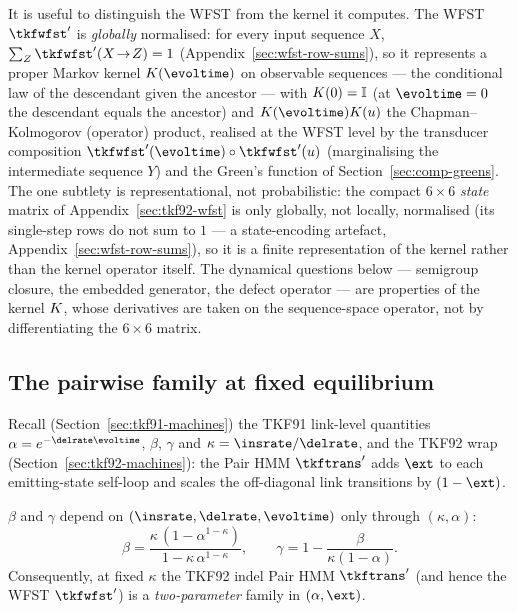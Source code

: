 It is useful to distinguish the WFST from the kernel it computes.  The
WFST $\tkfwfst'$ is \emph{globally} normalised: for every input sequence
$X$, $\sum_Z \tkfwfst'(X\!\to\!Z)=1$ (Appendix~\ref{sec:wfst-row-sums}),
so it represents a proper Markov kernel
$\obskern(\evoltime)$ on observable sequences --- the conditional law of
the descendant given the ancestor --- with $K(0)=\mathbb{I}$ (at
$\evoltime=0$ the descendant equals the ancestor) and
$\obskern(\evoltime)\obskern(\evolu)$ the Chapman--Kolmogorov (operator)
product, realised at the WFST level by the transducer composition
$\tkfwfst'(\evoltime)\circ\tkfwfst'(\evolu)$ (marginalising the
intermediate sequence $Y$) and the Green's function of
Section~\ref{sec:comp-greens}.  The one subtlety is representational, not
probabilistic: the compact $6{\times}6$ \emph{state} matrix of
Appendix~\ref{sec:tkf92-wfst} is only globally, not locally, normalised
(its single-step rows do not sum to $1$ --- a state-encoding artefact,
Appendix~\ref{sec:wfst-row-sums}), so it is a finite representation of the
kernel rather than the kernel operator itself.  The dynamical questions
below --- semigroup closure, the embedded generator, the defect operator
--- are properties of the kernel $K$, whose derivatives are taken on
the sequence-space operator, not by differentiating the $6{\times}6$
matrix.

\subsection{The pairwise family at fixed equilibrium}
\label{sec:comp-family}

Recall (Section~\ref{sec:tkf91-machines}) the TKF91 link-level quantities
$\alpha = e^{-\delrate\evoltime}$, $\beta$, $\gamma$ and
$\kappa = \insrate/\delrate$, and the TKF92 wrap (Section~\ref{sec:tkf92-machines}):
the Pair HMM $\tkftrans'$ adds $\ext$ to each emitting-state self-loop and
scales the off-diagonal link transitions by $(1-\ext)$.

\begin{lemma}
\label{lem:two-coords}
$\beta$ and $\gamma$ depend on $(\insrate,\delrate,\evoltime)$ only through
$(\kappa,\alpha)$:
\[
\beta = \frac{\kappa\,(1-\alpha^{1-\kappa})}{1-\kappa\,\alpha^{1-\kappa}},
\qquad
\gamma = 1 - \frac{\beta}{\kappa(1-\alpha)} .
\]
Consequently, at fixed $\kappa$ the TKF92 indel Pair HMM
$\tkftrans'$ (and hence the WFST $\tkfwfst'$) is a \emph{two-parameter}
family in $(\alpha,\ext)$.
\end{lemma}

